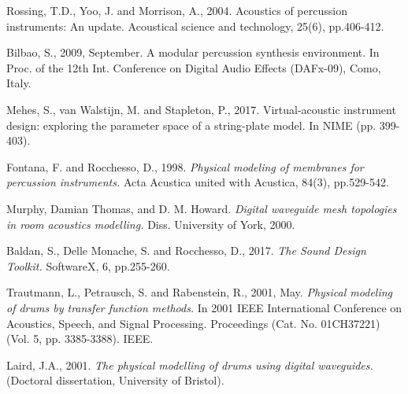 \documentclass{article}
\begin{document}
\begin{thebibliography}{9}

Rossing, T.D., Yoo, J. and Morrison, A., 2004.
Acoustics of percussion instruments: An update. Acoustical science and technology, 25(6), pp.406-412.

Bilbao, S., 2009, September.
A modular percussion synthesis environment. In Proc. of the 12th Int. Conference on Digital Audio Effects (DAFx-09), Como, Italy.

Mehes, S., van Walstijn, M. and Stapleton, P., 2017. Virtual-acoustic instrument design: exploring the parameter space of a string-plate model. In NIME (pp. 399-403).

Fontana, F. and Rocchesso, D., 1998.
\textit{Physical modeling of membranes for percussion instruments.}
Acta Acustica united with Acustica, 84(3), pp.529-542.

Murphy, Damian Thomas, and D. M. Howard.
\textit{Digital waveguide mesh topologies in room acoustics modelling.}
Diss. University of York, 2000.

Baldan, S., Delle Monache, S. and Rocchesso, D., 2017.
\textit{The Sound Design Toolkit.} SoftwareX, 6, pp.255-260.

Trautmann, L., Petrausch, S. and Rabenstein, R., 2001, May.
\textit{Physical modeling of drums by transfer function methods.}
In 2001 IEEE International Conference on Acoustics,
Speech, and Signal Processing. Proceedings
(Cat. No. 01CH37221) (Vol. 5, pp. 3385-3388). IEEE.

Laird, J.A., 2001.
\textit{The physical modelling of drums using digital waveguides.}
(Doctoral dissertation, University of Bristol).

\end{thebibliography}
\end{document}
